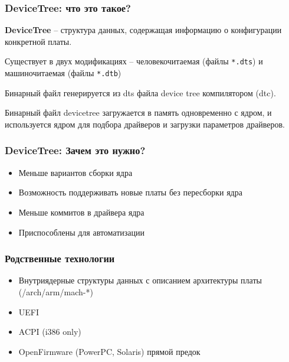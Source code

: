 \begin{frame}
  \frametitle{DeviceTree: что это такое?}
\textbf{DeviceTree} -- структура данных, содержащая информацию о конфигурации конкретной платы. 

\vspace{1cm}

Существует в двух модификациях -- человекочитаемая (файлы \texttt{*.dts}) и машиночитаемая (файлы \texttt{*.dtb})

\vspace{1cm}

Бинарный файл генерируется из dts файла device tree компилятором (dtc).

\vspace{1cm}

Бинарный файл devicetree загружается в память одновременно с ядром, и используется ядром для подбора драйверов и загрузки параметров драйверов.
\end{frame}

\begin{frame}
  \frametitle{DeviceTree: Зачем это нужно?}
  \begin{itemize}
     \item Меньше вариантов сборки ядра
     \item Возможность поддерживать новые платы без пересборки ядра
     \item Меньше коммитов в драйвера ядра 
     \item Приспособлены для автоматизации
  \end{itemize}
\end{frame}

\begin{frame}
  \frametitle{Родственные технологии}
  \begin{itemize}
      \item Внутриядерные структуры данных с описанием архитектуры платы (/arch/arm/mach-*) 
      \item UEFI
      \item ACPI (i386 only)
      \item OpenFirmware (PowerPC, Solaris) прямой предок
  \end{itemize}
\end{frame}

